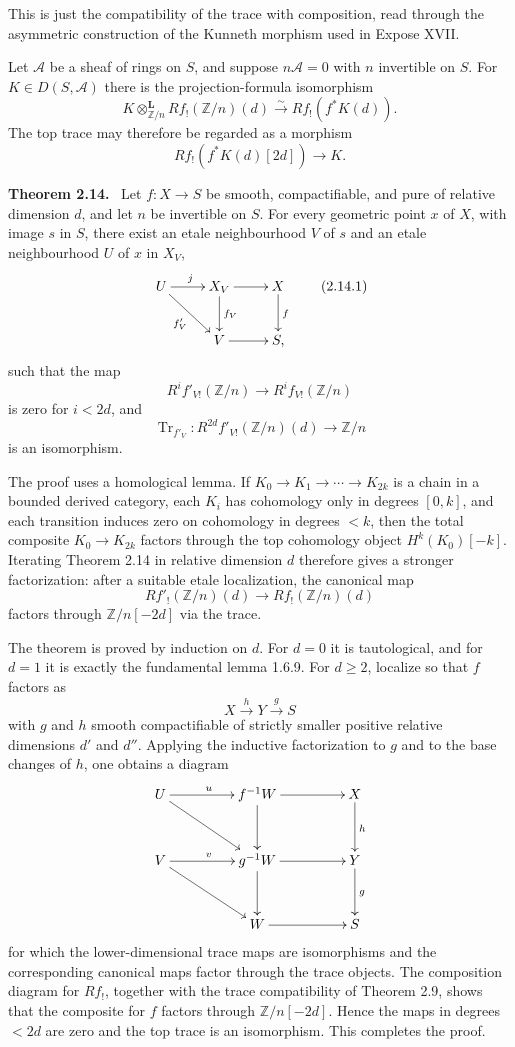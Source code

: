 \documentclass[12pt]{article}
\newcommand{\Zz}{\mathbb Z}
\newenvironment{statement}[1]{\par\medskip\noindent\textbf{#1.}\ }{\par\medskip}
\begin{document}
This is just the compatibility of the trace with composition, read through the asymmetric construction of the Kunneth morphism used in Expose XVII.

Let \(\mathcal A\) be a sheaf of rings on \(S\), and suppose \(n\mathcal A=0\) with \(n\) invertible on \(S\). For \(K\in D(S,\mathcal A)\) there is the projection-formula isomorphism
\[
K\otimes^{\mathbf L}_{\Zz/n}Rf_!(\Zz/n)(d)
\xrightarrow{\sim}
Rf_!(f^*K(d)).
\tag{2.13.1}
\]
The top trace may therefore be regarded as a morphism
\[
Rf_!(f^*K(d)[2d])\longrightarrow K.
\tag{2.13.2}
\]

\begin{statement}{Theorem 2.14}
Let \(f:X\to S\) be smooth, compactifiable, and pure of relative dimension \(d\), and let \(n\) be invertible on \(S\). For every geometric point \(x\) of \(X\), with image \(s\) in \(S\), there exist an etale neighbourhood \(V\) of \(s\) and an etale neighbourhood \(U\) of \(x\) in \(X_V\),
\[
\xymatrix{
U\ar[r]^j\ar[rd]_{f'_V}&X_V\ar[r]\ar[d]^{f_V}&X\ar[d]^f\\
&V\ar[r]&S,
}
\tag{2.14.1}
\]
such that the map
\[
R^if'_{V!}(\Zz/n)\to R^if_{V!}(\Zz/n)
\]
is zero for \(i<2d\), and
\[
\operatorname{Tr}_{f'_V}:R^{2d}f'_{V!}(\Zz/n)(d)\to\Zz/n
\]
is an isomorphism.
\end{statement}

The proof uses a homological lemma. If \(K_0\to K_1\to\cdots\to K_{2k}\) is a chain in a bounded derived category, each \(K_i\) has cohomology only in degrees \([0,k]\), and each transition induces zero on cohomology in degrees \(<k\), then the total composite \(K_0\to K_{2k}\) factors through the top cohomology object \(H^k(K_0)[-k]\). Iterating Theorem 2.14 in relative dimension \(d\) therefore gives a stronger factorization: after a suitable etale localization, the canonical map
\[
Rf'_!(\Zz/n)(d)\to Rf_!(\Zz/n)(d)
\]
factors through \(\Zz/n[-2d]\) via the trace.

The theorem is proved by induction on \(d\). For \(d=0\) it is tautological, and for \(d=1\) it is exactly the fundamental lemma 1.6.9. For \(d\geq2\), localize so that \(f\) factors as
\[
X\xrightarrow{h}Y\xrightarrow{g}S
\]
with \(g\) and \(h\) smooth compactifiable of strictly smaller positive relative dimensions \(d'\) and \(d''\). Applying the inductive factorization to \(g\) and to the base changes of \(h\), one obtains a diagram
\[
\xymatrix@C=1.6cm@R=1.1cm{
U\ar[r]^u\ar[rd]&f^{-1}W\ar[r]\ar[d]&X\ar[d]^h\\
V\ar[r]^v\ar[rd]&g^{-1}W\ar[r]\ar[d]&Y\ar[d]^g\\
&W\ar[r]&S
}
\]
for which the lower-dimensional trace maps are isomorphisms and the corresponding canonical maps factor through the trace objects. The composition diagram for \(Rf_!\), together with the trace compatibility of Theorem 2.9, shows that the composite for \(f\) factors through \(\Zz/n[-2d]\). Hence the maps in degrees \(<2d\) are zero and the top trace is an isomorphism. This completes the proof.

\bigskip
\end{document}

